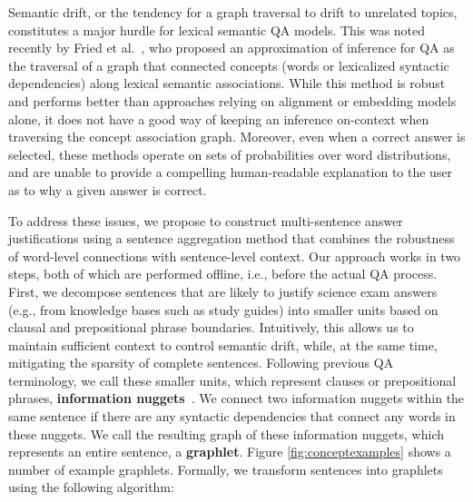 Semantic drift, or the tendency for a graph traversal to drift to unrelated topics,
constitutes a major hurdle for lexical semantic QA models.  
This was noted recently by Fried et al.~, who proposed an approximation of inference for QA as the traversal of a graph that connected concepts (words or lexicalized syntactic dependencies) along lexical semantic associations. While this method is robust and performs better than approaches relying on alignment or embedding models alone, it does not have a good way of keeping an inference on-context when traversing the concept association graph.
Moreover, even when a correct answer is selected, these methods operate on sets of probabilities over word distributions, and are unable to provide a compelling human-readable explanation to the user as to why a given answer is correct. 

To address these issues, we propose to construct multi-sentence answer justifications using a  sentence aggregation method that combines the robustness of word-level connections with sentence-level context.  
Our approach works in two steps, both of which are performed offline, i.e., before the actual QA process. First, we decompose sentences that are likely to justify science exam answers (e.g., from knowledge bases such as study guides) into smaller units based on clausal and prepositional phrase boundaries. Intuitively, this allows us to maintain sufficient context to control semantic drift, while, at the same time, mitigating the sparsity of complete sentences.  
Following previous QA terminology, we call these smaller units,  which represent clauses or prepositional phrases, {\bf information nuggets}~\cite{Voorhees:2003}. We connect two information nuggets within the same sentence if there are any syntactic dependencies that connect any words in these nuggets. We call the resulting graph of these information nuggets, which represents an entire sentence, a \textbf{graphlet}. 
Figure \ref{fig:conceptexamples} shows a number of example graphlets. 
Formally, we transform sentences into graphlets using the following algorithm:


